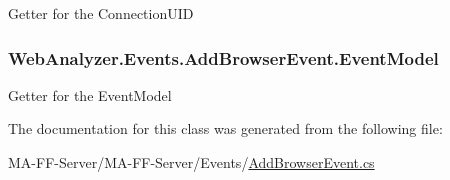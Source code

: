Getter for the Connection\+U\+I\+D 

\hypertarget{class_web_analyzer_1_1_events_1_1_add_browser_event_a4b3076f3d60100e7342be4da00a907fe}{}
\subsubsection[{Event\+Model}]{ Web\+Analyzer.\+Events.\+Add\+Browser\+Event.\+Event\+Model\hspace{0.3cm}{\ttfamily [get]}}\label{class_web_analyzer_1_1_events_1_1_add_browser_event_a4b3076f3d60100e7342be4da00a907fe}


Getter for the Event\+Model 



The documentation for this class was generated from the following file\+:\begin{DoxyCompactItemize}
\item 
M\+A-\/\+F\+F-\/\+Server/\+M\+A-\/\+F\+F-\/\+Server/\+Events/\hyperlink{_add_browser_event_8cs}{Add\+Browser\+Event.\+cs}\end{DoxyCompactItemize}
